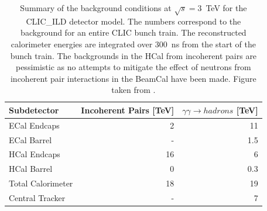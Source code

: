 \begin{table}[h!]
\centering
\begin{tabular}{ l r r }
\hline
Subdetector & Incoherent Pairs [TeV] & $\gamma\gamma \rightarrow hadrons$ [TeV] \\ 
\hline
ECal Endcaps & 2 & 11 \\
ECal Barrel & - & 1.5 \\
HCal Endcaps & 16 & 6 \\
HCal Barrel & 0 & 0.3 \\
\hline
Total Calorimeter & 18 & 19 \\
\hline
Central Tracker & - & 7 \\ 
\hline
\end{tabular}
\caption[Summary of the background conditions at $\sqrt{s}=3$~TeV for the CLIC\_ILD detector model.  The numbers correspond to the background for an entire CLIC bunch train, i.e. 312 bunch crossings separated by a 0.5~ns gap.  The reconstructed calorimeter energies are integrated over 300~ns from the start of the bunch train. The backgrounds in the HCal from incoherent pairs are pessimistic as no attempts to mitigate the effect of neutrons from incoherent pair interactions in the BeamCal have been made.  Figure taken from \cite{Linssen:2012hp}.]{Summary of the background conditions at $\sqrt{s}=3$~TeV for the CLIC\_ILD detector model.  The numbers correspond to the background for an entire CLIC bunch train.  The reconstructed calorimeter energies are integrated over 300~ns from the start of the bunch train. The backgrounds in the HCal from incoherent pairs are pessimistic as no attempts to mitigate the effect of neutrons from incoherent pair interactions in the BeamCal have been made.  Figure taken from \cite{Linssen:2012hp}.}
\label{table:clicbkgsummary}
\end{table}


